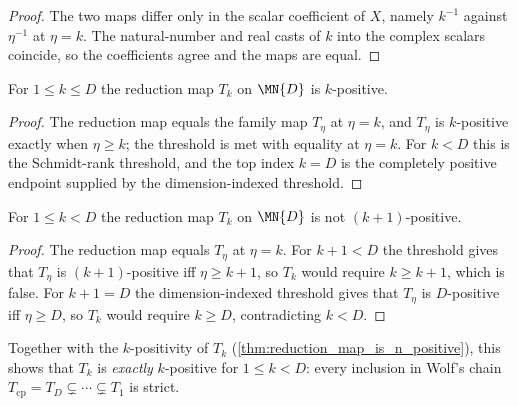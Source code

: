\begin{proof}
    \leanok
    The two maps differ only in the scalar coefficient of $X$, namely $k^{-1}$
    against $\eta^{-1}$ at $\eta=k$. The natural-number and real casts of $k$
    into the complex scalars coincide, so the coefficients agree and the maps
    are equal.
\end{proof}

\begin{theorem}
    \label{thm:reduction_map_is_n_positive}
    \leanok
    For $1\le k\le D$ the reduction map $T_k$ on $\MN{D}$ is $k$-positive.
\end{theorem}

\begin{proof}
    \leanok
    The reduction map equals the family map $T_\eta$ at $\eta=k$, and $T_\eta$ is
    $k$-positive exactly when $\eta\ge k$; the threshold is met with equality at
    $\eta=k$. For $k<D$ this is the Schmidt-rank threshold, and the top index
    $k=D$ is the completely positive endpoint supplied by the dimension-indexed
    threshold.
\end{proof}

\begin{theorem}
    \label{thm:reduction_map_not_n_positive_succ}
    \leanok
    For $1\le k<D$ the reduction map $T_k$ on $\MN{D}$ is not $(k+1)$-positive.
\end{theorem}

\begin{proof}
    \leanok
    The reduction map equals $T_\eta$ at $\eta=k$. For $k+1<D$ the threshold
    gives that $T_\eta$ is $(k+1)$-positive iff $\eta\ge k+1$, so $T_k$ would
    require $k\ge k+1$, which is false. For $k+1=D$ the dimension-indexed
    threshold gives that $T_\eta$ is $D$-positive iff $\eta\ge D$, so $T_k$ would
    require $k\ge D$, contradicting $k<D$.
\end{proof}

\begin{remark}
    Together with the $k$-positivity of $T_k$
    (\ref{thm:reduction_map_is_n_positive}), this shows that $T_k$ is
    \emph{exactly} $k$-positive for $1\le k<D$: every inclusion in Wolf's chain
    $T_{\mathrm{cp}}=T_D\subsetneq\cdots\subsetneq T_1$ is strict.
\end{remark}

